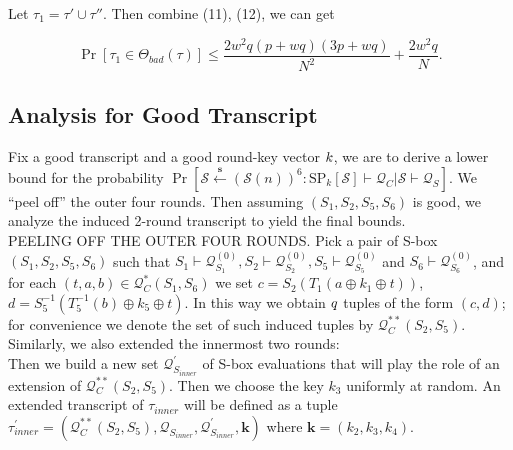 Let $\tau_{1} = \tau' \cup \tau''$. Then combine (11), (12), we can get

\begin{equation}
\operatorname{Pr}[\tau_{1} \in \Theta_{bad}(\tau)] \leq \frac{2w^2 q (p+w q) (3 p +w q)}{N^{2}} + \frac{2w^{2} q}{N}.
\end{equation}


\subsection{Analysis for Good Transcript}

\noindent Fix a good transcript and a good round-key vector $\mathnormal{k}$, we are to derive a lower bound for the probability  $\operatorname{Pr}\left[\mathcal{S} \stackrel{\mathbf{s}}{\leftarrow}(\mathcal{S}(n))^{6}: \mathrm{SP}_{k}[\mathcal{S}] \vdash \mathcal{Q}_{C} | \mathcal{S} \vdash \mathcal{Q}_{S}\right]$. We ``peel off'' the outer four rounds. Then assuming $(S_{1}, S_2, S_{5}, S_6)$ is good, we analyze the induced 2-round transcript to yield the final bounds.\\

\noindent
\textsc{PEELING OFF THE OUTER FOUR ROUNDS}. Pick a pair of S-box $(S_1, S_2, S_{5}, S_6)$ such that $S_{1} \vdash \mathcal{Q}_{S_{1}}^{(0)}, S_{2} \vdash \mathcal{Q}_{S_{2}}^{(0)}, S_{5} \vdash \mathcal{Q}_{S_{5}}^{(0)}$   and $S_{6} \vdash \mathcal{Q}_{S_{6}}^{(0)}$, and for each $ (t, a, b) \in \mathcal{Q}_{C}^{*}\left(S_{1}, S_{6}\right)$ we set $c=S_{2}\left(T_1\left(a \oplus k_{1} \oplus t\right)\right)$, $d=S_{5}^{-1}\left(T_5^{-1}\left(b\right) \oplus k_{5} \oplus t\right)$. In this way we obtain $\mathnormal{q}$ tuples of the form $(c, d)$; for convenience we denote the set of such induced tuples by $\mathcal{Q}_{C}^{**}\left(S_{2}, S_{5}\right)$. Similarly, we also extended the innermost two rounds:\\

Then we build a new set $\mathcal{Q}_{S_{inner}}^{\prime}$ of S-box evaluations that will play the role of an extension of $\mathcal{Q}_{C}^{**}\left(S_{2}, S_{5}\right)$. Then we choose the key $k_3$ uniformly at random. An extended transcript of $\tau_{inner}$ will be defined as a tuple $\tau_{inner}^{\prime}=\left(\mathcal{Q}_{C}^{**}\left(S_{2}, S_{5}\right), \mathcal{Q}_{S_{inner}}, \mathcal{Q}_{S_{inner}}^{\prime}, \mathbf{k}\right)$ where $\mathbf{k}=\left(k_{2}, k_{3}, k_{4}\right)$.\\

